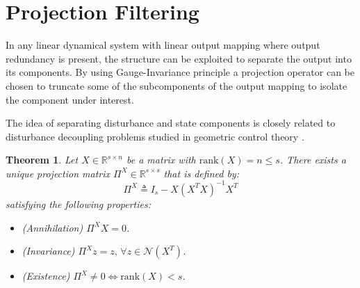 \documentclass[pdflatex,sn-mathphys-num]{sn-jnl}%
\theoremstyle{thmstyleone}%
\newtheorem{theorem}{Theorem}%
\theoremstyle{thmstyletwo}%
\theoremstyle{thmstylethree}%
\begin{document}
\section{Projection Filtering}
In any linear dynamical system with linear output mapping where output redundancy is present, the structure can be exploited to separate the output into its components. By using Gauge-Invariance principle a projection operator can be chosen to truncate some of the subcomponents of the output mapping to isolate the component under interest. 

The idea of separating disturbance and state components is closely related to disturbance decoupling problems studied in geometric control theory \cite{BasileMarro1992}.

\begin{theorem}%
Let $X\in \mathbb{R}^{s\times n}$ be a matrix with $\mathrm{rank}(X)=n\leq s$. There exists a unique projection matrix $\Pi^X\in\mathbb{R}^{s\times s}$ that is defined by:
\begin{equation*}
    \Pi^X\triangleq I_s-X{(X^T X)}^{-1}X^T \label{eq:projection}
\end{equation*}
satisfying the following properties:
\begin{itemize}
    \item (\textit{Annihilation}) $\Pi^X X=0$.
    \item (\textit{Invariance}) $\Pi^X z=z,\,\forall z\in\mathcal{N}(X^T)$.
    \item (\textit{Existence}) $\Pi^X \neq 0 \iff \mathrm{rank}(X)<s$.
\end{itemize}
\end{theorem}
\end{document}
